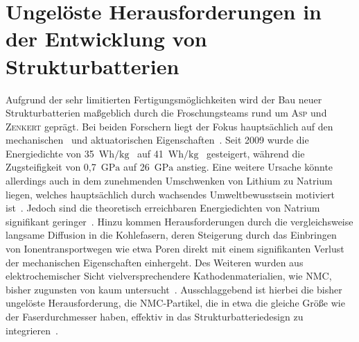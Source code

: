 \section{Ungelöste Herausforderungen in der Entwicklung von Strukturbatterien}

Aufgrund der sehr limitierten Fertigungsmöglichkeiten wird der Bau neuer Strukturbatterien maßgeblich durch die Froschungsteams rund um \textsc{Asp} und \textsc{Zenkert} geprägt. Bei beiden Forschern liegt der Fokus hauptsächlich auf den mechanischen~\cite{Carlstedt2019a,Asp2021,Duan2021} und aktuatorischen Eigenschaften~\cite{Carlstedt2023}. Seit 2009 wurde die Energiedichte von 35~$\si{\watt \hour \per \kg}$~\cite{Liu2009} auf 41~$\si{\watt \hour \per \kg}$~\cite{Siraj2023} gesteigert, während die Zugsteifigkeit von 0,7~$\si{\GPa}$ auf 26~$\si{\GPa}$ anstieg. Eine weitere Ursache könnte allerdings auch in dem zunehmenden Umschwenken von Lithium zu Natrium liegen, welches hauptsächlich durch wachsendes Umweltbewusstsein motiviert ist~\cite{Peters2022}. Jedoch sind die theoretisch erreichbaren Energiedichten von Natrium signifikant geringer~\cite{Kundu2015}. Hinzu kommen Herausforderungen durch die vergleichsweise langsame Diffusion in die Kohlefasern, deren Steigerung durch das Einbringen von Ionentransportwegen wie etwa Poren direkt mit einem signifikanten Verlust der mechanischen Eigenschaften einhergeht. Des Weiteren wurden aus elektrochemischer Sicht vielversprechendere Kathodenmaterialien, wie NMC, bisher zugunsten von  kaum untersucht~\cite{Asp2024}. Ausschlaggebend ist hierbei die bisher ungelöste Herausforderung, die NMC-Partikel, die in etwa die gleiche Größe wie der Faserdurchmesser haben, effektiv in das Strukturbatteriedesign zu integrieren~\cite{Asp2014}.

